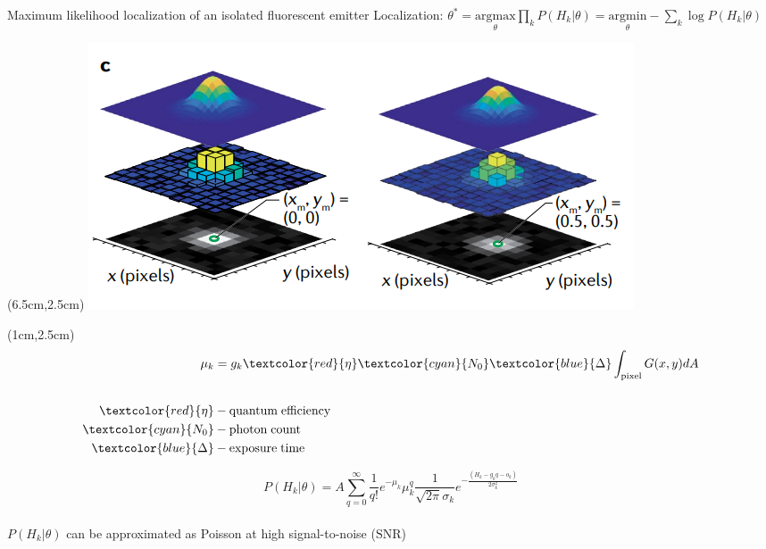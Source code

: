 \documentclass{beamer}					%
\begin{document}
\begin{frame}{Maximum likelihood localization of an isolated fluorescent emitter}
Localization: $\theta^{*} = \underset{\theta}{\mathrm{argmax}}\prod_{k}P(H_{k}|\theta)= \underset{\theta}{\mathrm{argmin}}-\sum_{k}\log P(H_{k}|\theta)$

\begin{textblock*}{8cm}(6.5cm,2.5cm)
\includegraphics[width=\textwidth]{Model.png}
\end{textblock*}

\begin{textblock*}{2cm}(1cm,2.5cm)
\begin{align*}
\mu_{k} &= g_{k}\textcolor{red}{\eta} \textcolor{cyan}{N_{0}}\textcolor{blue}{\Delta}\int_{\mathrm{pixel}} G(x,y)dA\\
\\
\textcolor{red}{\eta} &- \mathrm{quantum\; efficiency}\\
\textcolor{cyan}{N_{0}} &- \mathrm{photon\; count}\\
\textcolor{blue}{\Delta} &- \mathrm{exposure\; time}
\end{align*}
\end{textblock*}


\vspace{2in}

\begin{equation*}
P(H_{k}|\theta) = A\sum_{q=0}^{\infty} \frac{1}{q!}e^{-\mu_{k}}\mu_{k}^{q}\frac{1}{\sqrt{2\pi}\sigma_{k}}e^{-\frac{(H_{k}-g_{k}q-o_{k})}{2\sigma_{k}^{2}}}
\end{equation*}
\\
$P(H_{k}|\theta)$ can be approximated as Poisson at high signal-to-noise ($\mathrm{SNR}$)

\end{frame}
\end{document}
